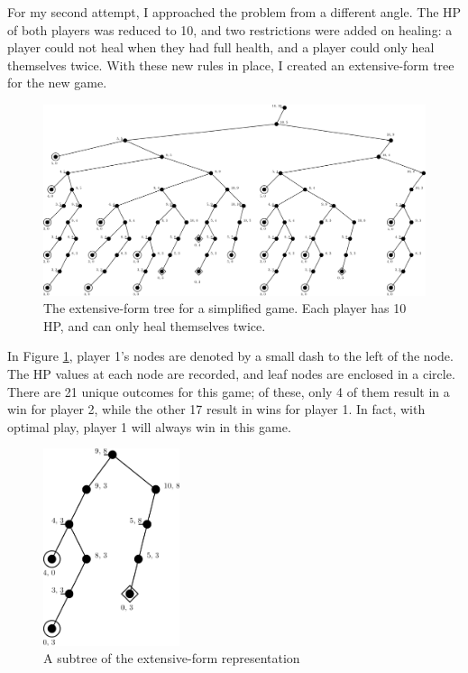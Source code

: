 For my second attempt, I approached the problem from a different angle. The HP of both players was reduced to 10, and two restrictions were added on healing: a player could not heal when they had full health, and a player could only heal themselves twice. With these new rules in place, I created an extensive-form tree for the new game.\\

\begin{figure}[H]
  \centering
  \includegraphics[width=15cm]{figures/GameTree.png}
  \caption{The extensive-form tree for a simplified game. Each player has 10 HP, and can only heal themselves twice.}
  \label{fig:gameTree}
\end{figure}

In Figure \ref{fig:gameTree}, player 1's nodes are denoted by a small dash to the left of the node. The HP values at each node are recorded, and leaf nodes are enclosed in a circle. There are 21 unique outcomes for this game; of these, only 4 of them result in a win for player 2, while the other 17 result in wins for player 1. In fact, with optimal play, player 1 will always win in this game.\\

\begin{figure}[H]
  \centering
  \includegraphics[width=4cm]{figures/GameSubtree.png}
  \caption{A subtree of the extensive-form representation}
  \label{fig:gameSubtree}
\end{figure}

